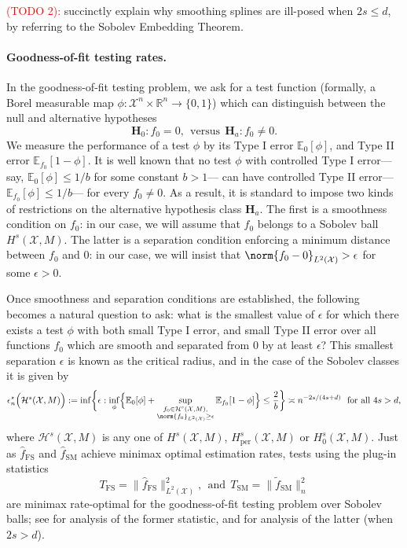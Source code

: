 \documentclass{article}
\newcommand{\Reals}{\mathbb{R}}
\newcommand{\1}{\mathbf{1}}
\newcommand{\Xset}{\mathcal{X}}
\newcommand{\Leb}{L}
\newcommand{\mc}[1]{\mathcal{#1}}
\newcommand{\Ebb}{\mathbb{E}}
\newcommand{\wt}[1]{\widetilde{#1}}
\newcommand{\wh}[1]{\widehat{#1}}
\newcommand{\SM}{\mathrm{SM}}
\newcommand{\OS}{\mathrm{FS}}
\theoremstyle{alden}
\theoremstyle{aldenthm}
\theoremstyle{definition}
\theoremstyle{remark}
\begin{document}
\textcolor{red}{(TODO 2):} succinctly explain why smoothing splines are ill-posed when $2s \leq d$, by referring to the Sobolev Embedding Theorem.

\paragraph{Goodness-of-fit testing rates.} 

In the goodness-of-fit testing problem, we ask for a test function (formally, a Borel measurable map $\phi: \mc{X}^n \times \Reals^n \to \{0,1\}$) which can distinguish between the null and alternative hypotheses
\begin{equation}
\mathbf{H}_0: f_0 = 0, ~~\textrm{versus}~~ \mathbf{H}_a: f_0 \neq 0.
\end{equation}
We measure the performance of a test $\phi$ by its Type I error $\Ebb_0[\phi]$, and Type II error $\mathbb{E}_{f_0}[1 - \phi]$. It is well known that no test $\phi$ with controlled Type I error---say, $\Ebb_0[\phi] \leq 1/b$ for some constant $b > 1$---
can have controlled Type II error---$\Ebb_{f_0}[\phi] \leq 1/b$--- for every $f_0 \neq 0$. As a result, it is standard to impose two kinds of restrictions on the alternative hypothesis class $\mathbf{H}_a$. The first is a smoothness condition on $f_0$: in our case, we will assume that $f_0$ belongs to a Sobolev ball $H^s(\Xset,M)$. The latter is a separation condition enforcing a minimum distance between $f_0$ and $0$: in our case, we will insist that $\norm{f_0  - 0}_{\Leb^2(\Xset)} > \epsilon$ for some $\epsilon > 0$.

Once smoothness and separation conditions are established, the following becomes a natural question to ask: what is the smallest value of $\epsilon$ for which there exists a test $\phi$ with both small Type I error, and small Type II error over all functions $f_0$ which are smooth and separated from $0$ by at least $\epsilon$? This smallest separation $\epsilon$ is known as the critical radius, and in the case of the Sobolev classes it is given by
\begin{equation}
\label{eqn:sobolev_space_testing_critical_radius}
\epsilon_n^{\star}\Bigl(\mc{H}^s(\Xset,M)\Bigr):= \inf\biggl\{\epsilon: \inf_{\phi} \Bigl\{\Ebb_0[\phi] +  \sup_{\substack{f_0 \in \mc{H}^s(\Xset,M), \\ \norm{f_0}_{\Leb^2(\Xset)} \geq \epsilon}} \Ebb_{f_0}[1 - \phi]\Bigr\} \leq \frac{2}{b} \biggr\} \asymp n^{-2s/(4s + d)}~~\textrm{for all $4s > d$,}
\end{equation}
where $\mc{H}^s(\Xset,M)$ is any one of $H^s(\Xset,M)$, $H_{\mathrm{per}}^s(\Xset,M)$ or $H_0^s(\Xset,M)$.  Just as $\wh{f}_{\OS}$ and $\wh{f}_{\SM}$ achieve minimax optimal estimation rates, tests using the plug-in statistics
\begin{equation*}
T_{\OS} = \bigl\|\wh{f}_{\OS}\bigr\|_{\Leb^2(\Xset)}^2,~~\textrm{and}~~T_{\SM} = \bigl\|\wt{f}_{\SM}\bigr\|_{n}^2
\end{equation*}
are minimax rate-optimal for the goodness-of-fit testing problem over Sobolev balls; see \citet{ingster2009} for analysis of the former statistic, and \citet{liu2019} for analysis of the latter (when $2s > d$).
\end{document}
